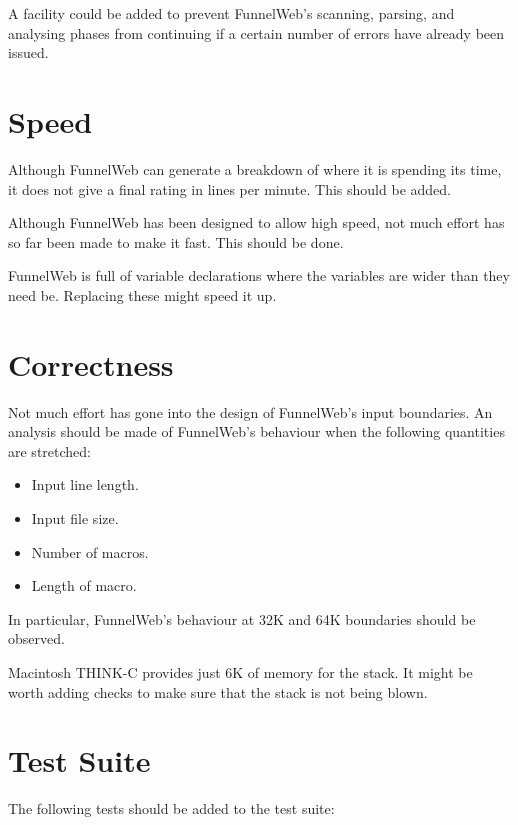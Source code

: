  A facility could be added to prevent
FunnelWeb's scanning, parsing, and analysing phases from continuing if
a certain number of errors have already been issued.


\section{Speed}

 Although FunnelWeb can generate a breakdown
of where it is spending its time, it does not give a final rating in
lines per minute. This should be added.

 Although FunnelWeb has been designed to allow
high speed, not much effort has so far been made to make it fast. This should
be done.

 FunnelWeb is full of variable declarations
where the variables are wider than they need be. Replacing these might speed
it up.

\section{Correctness}

 Not much effort has gone into the design of
FunnelWeb's input boundaries. An analysis should be made of FunnelWeb's
behaviour when the following quantities are stretched:

\begin{itemize}
\item Input line length.
\item Input file size.
\item Number of macros.
\item Length of macro.
\end{itemize}

In particular, FunnelWeb's behaviour at 32K and 64K boundaries should be
observed.

 Macintosh THINK-C provides just 6K of memory for
the stack. It might be worth adding checks to make sure that the stack is
not being blown.

\section{Test Suite}

The following tests should be added to the test suite:

